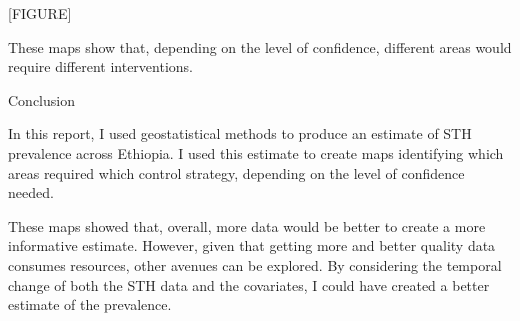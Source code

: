 \documentclass[
]{article}
\begin{document}
{[}FIGURE{]}

These maps show that, depending on the level of confidence, different
areas would require different interventions.

Conclusion

In this report, I used geostatistical methods to produce an estimate of
STH prevalence across Ethiopia. I used this estimate to create maps
identifying which areas required which control strategy, depending on
the level of confidence needed.

These maps showed that, overall, more data would be better to create a
more informative estimate. However, given that getting more and better
quality data consumes resources, other avenues can be explored. By
considering the temporal change of both the STH data and the covariates,
I could have created a better estimate of the prevalence.
\end{document}
